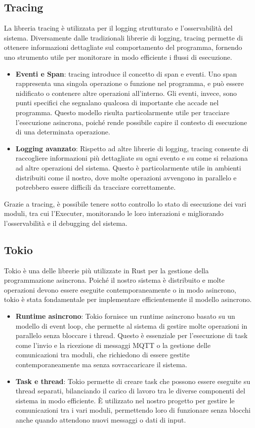 \documentclass[target=bach,aauheader=,style=]{thud}
\begin{document}
\subsection{Tracing}
La libreria tracing \cite{rust_tracing} è utilizzata per il logging strutturato e l'osservabilità del sistema. Diversamente dalle tradizionali librerie di logging, tracing permette di ottenere informazioni dettagliate sul comportamento del programma, fornendo uno strumento utile per monitorare in modo efficiente i flussi di esecuzione.
\begin{itemize}
  \item \textbf{Eventi e Span}: tracing introduce il concetto di span e eventi. Uno span rappresenta una singola operazione o funzione nel programma, e può essere nidificato o contenere altre operazioni all'interno. Gli eventi, invece, sono punti specifici che segnalano qualcosa di importante che accade nel programma. Questo modello risulta particolarmente utile per tracciare l'esecuzione asincrona, poiché rende possibile capire il contesto di esecuzione di una determinata operazione.
  \item \textbf{Logging avanzato}: Rispetto ad altre librerie di logging, tracing consente di raccogliere informazioni più dettagliate su ogni evento e su come si relaziona ad altre operazioni del sistema. Questo è particolarmente utile in ambienti distribuiti come il nostro, dove molte operazioni avvengono in parallelo e potrebbero essere difficili da tracciare correttamente.
\end{itemize}

Grazie a tracing, è possibile tenere sotto controllo lo stato di esecuzione dei vari moduli, tra cui l'Executer, monitorando le loro interazioni e migliorando l'osservabilità e il debugging del sistema.

\subsection{Tokio}
Tokio \cite{rust_tokio} è una delle librerie più utilizzate in Rust per la gestione della programmazione asincrona. Poiché il nostro sistema è distribuito e molte operazioni devono essere eseguite contemporaneamente o in modo asincrono, tokio è stata fondamentale per implementare efficientemente il modello asincrono.
\begin{itemize}
  \item \textbf{Runtime asincrono}: Tokio fornisce un runtime asincrono basato su un modello di event loop, che permette al sistema di gestire molte operazioni in parallelo senza bloccare i thread. Questo è essenziale per l'esecuzione di task come l'invio e la ricezione di messaggi MQTT o la gestione delle comunicazioni tra moduli, che richiedono di essere gestite contemporaneamente ma senza sovraccaricare il sistema.
  \item \textbf{Task e thread}: Tokio permette di creare task che possono essere eseguite su thread separati, bilanciando il carico di lavoro tra le diverse componenti del sistema in modo efficiente. È utilizzato nel nostro progetto per gestire le comunicazioni tra i vari moduli, permettendo loro di funzionare senza blocchi anche quando attendono nuovi messaggi o dati di input.
\end{itemize}
\end{document}
